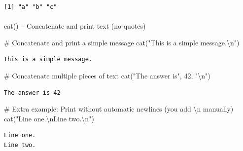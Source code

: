 \documentclass[
  letterpaper,
  DIV=11,
  numbers=noendperiod]{scrartcl}
\makeatletter
\let\oldparagraph\paragraph
\renewcommand{\paragraph}{
    \@ifstar
      \xxxParagraphStar
      \xxxParagraphNoStar
  }
\newcommand{\xxxParagraphStar}[1]{\oldparagraph*{#1}\mbox{}}
\newcommand{\xxxParagraphNoStar}[1]{\oldparagraph{#1}\mbox{}}
\newenvironment{Shaded}{\begin{snugshade}}{\end{snugshade}}
\newcommand{\CommentTok}[1]{\textcolor[rgb]{0.37,0.37,0.37}{#1}}
\newcommand{\DecValTok}[1]{\textcolor[rgb]{0.68,0.00,0.00}{#1}}
\newcommand{\FunctionTok}[1]{\textcolor[rgb]{0.28,0.35,0.67}{#1}}
\newcommand{\NormalTok}[1]{\textcolor[rgb]{0.00,0.23,0.31}{#1}}
\newcommand{\SpecialCharTok}[1]{\textcolor[rgb]{0.37,0.37,0.37}{#1}}
\newcommand{\StringTok}[1]{\textcolor[rgb]{0.13,0.47,0.30}{#1}}
\makeatother
\begin{document}
\begin{verbatim}
[1] "a" "b" "c"
\end{verbatim}

\paragraph{cat() -- Concatenate and print text (no
quotes)}\label{cat-concatenate-and-print-text-no-quotes}

\begin{Shaded}
\begin{Highlighting}[]
\CommentTok{\#   Concatenate and print a simple message}
\FunctionTok{cat}\NormalTok{(}\StringTok{"This is a simple message.}\SpecialCharTok{\textbackslash{}n}\StringTok{"}\NormalTok{)}
\end{Highlighting}
\end{Shaded}

\begin{verbatim}
This is a simple message.
\end{verbatim}

\begin{Shaded}
\begin{Highlighting}[]
\CommentTok{\#   Concatenate multiple pieces of text}
\FunctionTok{cat}\NormalTok{(}\StringTok{"The answer is"}\NormalTok{, }\DecValTok{42}\NormalTok{, }\StringTok{"}\SpecialCharTok{\textbackslash{}n}\StringTok{"}\NormalTok{)}
\end{Highlighting}
\end{Shaded}

\begin{verbatim}
The answer is 42 
\end{verbatim}

\begin{Shaded}
\begin{Highlighting}[]
\CommentTok{\# Extra example: Print without automatic newlines (you add \textbackslash{}n manually)}
\FunctionTok{cat}\NormalTok{(}\StringTok{"Line one.}\SpecialCharTok{\textbackslash{}n}\StringTok{Line two.}\SpecialCharTok{\textbackslash{}n}\StringTok{"}\NormalTok{)}
\end{Highlighting}
\end{Shaded}

\begin{verbatim}
Line one.
Line two.
\end{verbatim}
\end{document}
